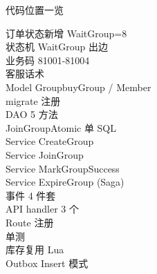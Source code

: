 \documentclass[aspectratio=169,11pt]{beamer}
\begin{document}
\begin{frame}[shrink]{代码位置一览}
\begin{description}
  \item[订单状态新增 WaitGroup=8]
  \item[状态机 WaitGroup 出边]
  \item[业务码 81001-81004]
  \item[客服话术]
  \item[Model GroupbuyGroup / Member]
  \item[migrate 注册]
  \item[DAO 5 方法]
  \item[JoinGroupAtomic 单 SQL]
  \item[Service CreateGroup]
  \item[Service JoinGroup]
  \item[Service MarkGroupSuccess]
  \item[Service ExpireGroup (Saga)]
  \item[事件 4 件套]
  \item[API handler 3 个]
  \item[Route 注册]
  \item[单测]
  \item[库存复用 Lua]
  \item[Outbox Insert 模式]
\end{description}
\end{frame}
\end{document}
